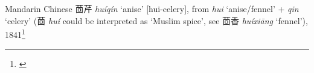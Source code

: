 \begin{etymology}\label{ety:huiqin}
Mandarin Chinese {茴芹} \textit{huíqín} `anise' [hui-celery], from \textit{hui} `anise/fennel' + \textit{qin} `celery' (茴 \textit{huí} could be interpreted as `Muslim spice', see 茴香 \textit{huíxiāng} `fennel'), 1841\footnote{\textcite{kleeman_oxford_2010; hu_food_2005}}
\end{etymology}